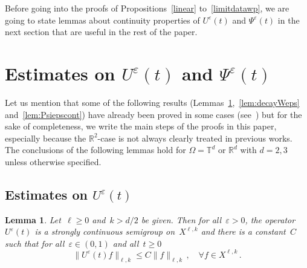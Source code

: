 \documentclass[11pt]{article}
\newtheorem{lemm}[theo]{Lemma}
\theoremstyle{definition}
\numberwithin{equation}{section}
\numberwithin{figure}{section}
\numberwithin{table}{section}
\newcommand*\R {\mathbb{R}}
\newcommand*\T {\mathbb{T}}
\newcommand*\eps{{\varepsilon}}
\let\oldforall\forall
\renewcommand*{\forall}{\mathrel{\oldforall}}
\begin{document}
Before going into the proofs of Propositions~\ref{linear} to~\ref{limitdatawp}, we are going to state lemmas about continuity properties of $U^\eps(t)$ and $\Psi^\eps(t)$ in the next section that are useful in the rest of the paper.

\section{Estimates on \texorpdfstring{$U^\eps(t)$}{U eps(t)} and \texorpdfstring{$\Psi^\eps(t)$}{Psi eps(t)}}
Let us mention that some of the following results (Lemmas~\ref{lem:Uepscont},~\ref{lem:decayWeps} and~\ref{lem:Psiepscont}) have already been proved in some cases (see~\cite{Bardos-Ukai}) but for the sake of completeness, we write the main steps of the proofs in this paper, especially because the $\R^2$-case is not always clearly treated in previous works. The conclusions of the following lemmas hold for $\Omega=\T^d$ or $\R^d$ with $d=2,3$ unless otherwise specified.


\subsection{Estimates on \texorpdfstring{$U^\eps(t)$}{U eps(t)}}

\begin{lemm}\label{lem:Uepscont}
Let~$\ell \ge 0$ and~${k>d/2}$ be given. Then for all~$\eps>0$, the operator~$ U^\eps(t) $ is a strongly continuous semigroup on~$X^{\ell,k}$ and there is a constant~$C$ such that for all~$\eps \in (0,1)$ and all~$t \geq 0$
\begin{equation}\label{boundUeps}
\|U^\eps(t) f \|_{\ell,k} \leq C \| f\|_{\ell,k} \,, \quad \forall f \in X^{\ell,k} \,.
\end{equation}
\end{lemm}
\end{document}
